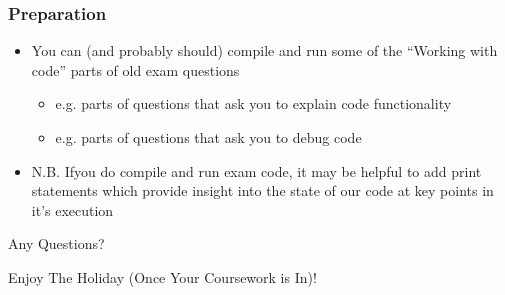 \documentclass{beamer}
\begin{document}
\begin{frame}
\frametitle{Preparation}
\begin{itemize}
\item You can (and probably should) compile and run some of the ``Working with code'' parts of old exam questions
\begin{itemize}
\item e.g. parts of questions that ask you to explain code functionality
\item e.g. parts of questions that ask you to debug code
\end{itemize}
\item N.B. Ifyou do compile and run exam code, it may be helpful to add print statements which provide insight into the state of our code at key points in it's execution
\end{itemize}
\end{frame}

\begin{frame}
\begin{center}
Any Questions?
\end{center}
\end{frame}

\begin{frame}
\begin{center}
Enjoy The Holiday (Once Your Coursework is In)!
\end{center}
\end{frame}
\end{document}
